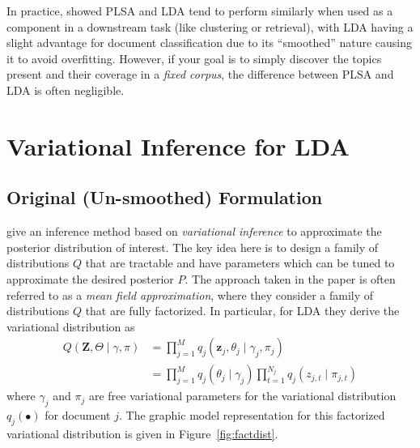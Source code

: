 \documentclass[11pt]{article}
\begin{document}
In practice, \citet{Lu:2011:JIR} showed PLSA and LDA tend to perform
similarly when used as a component in a downstream task (like clustering or
retrieval), with LDA having a slight advantage for document classification
due to its ``smoothed'' nature causing it to avoid overfitting. However, if
your goal is to simply discover the topics present and their coverage in a
\emph{fixed corpus}, the difference between PLSA and LDA is often
negligible.

\section{Variational Inference for LDA}
\subsection{Original (Un-smoothed) Formulation}

\citet{Blei:2003:LDA} give an inference method based on \emph{variational
inference} to approximate the posterior distribution of interest. The key
idea here is to design a family of distributions $Q$ that are tractable and
have parameters which can be tuned to approximate the desired posterior
$P$. The approach taken in the paper is often referred to as a \emph{mean
field approximation}, where they consider a family of distributions $Q$
that are fully factorized. In particular, for LDA they derive the
variational distribution as
\begin{align}
  Q(\mathbf{Z}, \Theta \mid \gamma, \pi)
  &= \prod_{j=1}^M q_j(\mathbf{z}_j, \theta_j \mid \gamma_j, \pi_j)\\
  &= \prod_{j=1}^M q_j(\theta_j \mid
  \gamma_j) \prod_{t=1}^{N_j} q_j(z_{j,t} \mid \pi_{j,t})
\end{align}
where $\gamma_j$ and $\pi_{j}$ are free variational parameters for the
variational distribution $q_j(\bullet)$ for document $j$. The graphic model
representation for this factorized variational distribution is given in
Figure~\ref{fig:factdist}.
\end{document}
